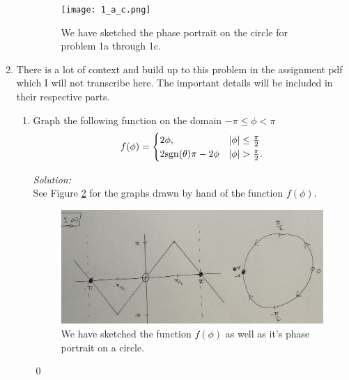 \documentclass[10pt]{amsart}
\theoremstyle{nonumberplain}
\begin{document}
\begin{enumerate}[label={\bf {\arabic*}:}]
\begin{enumerate}
\begin{figure}[h]
	\centering
	\texttt{[image: 1\_a\_c.png]}
 	\caption{We have sketched the phase portrait on the circle for problem 1a through 1c.}\label{fig:f1}
\end{figure}

\end{enumerate}

\newpage

\item There is a lot of context and build up to this problem in the assignment pdf which I will not transcribe here.
The important details will be included in their respective parts. \\

\begin{enumerate}

\item Graph the following function on the domain $-\pi \leq \phi < \pi$
\begin{align*}
f(\phi) = \begin{cases}
2\phi, & |\phi| \leq \frac \pi 2 \\
2 {\rm sgn}(\theta)\pi - 2\phi & |\phi| > \frac \pi 2.
\end{cases}
\end{align*}

\textit{Solution:} \\
See Figure \ref{fig:f2} for the graphs drawn by hand of the function $f(\phi)$. \\
\begin{figure}[h]
	\centering
	\includegraphics[height=.4\textwidth]{2_a.png}
 	\caption{We have sketched the function $f(\phi)$ as well as it's phase portrait on a circle.}\label{fig:f2}
\end{figure}

\qed \\


\end{enumerate}
\end{enumerate}
\end{document}

